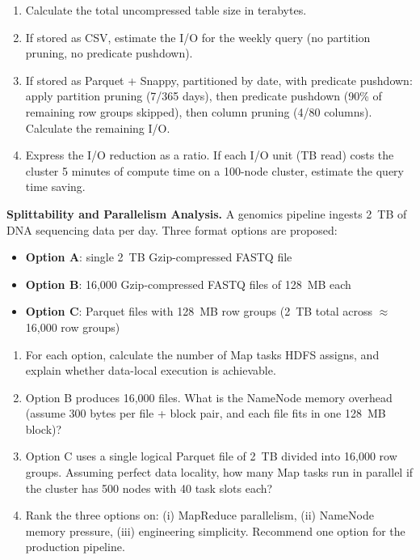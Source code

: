 \begin{enumerate}[label=(\alph*)]
  \item Calculate the total uncompressed table size in terabytes.
  \item If stored as CSV, estimate the I/O for the weekly query
        (no partition pruning, no predicate pushdown).
  \item If stored as Parquet + Snappy, partitioned by date, with
        predicate pushdown: apply partition pruning (7/365 days),
        then predicate pushdown (90\% of remaining row groups skipped),
        then column pruning (4/80 columns). Calculate the remaining I/O.
  \item Express the I/O reduction as a ratio. If each I/O unit
        (TB read) costs the cluster 5 minutes of compute time on
        a 100-node cluster, estimate the query time saving.
\end{enumerate}

\ap \textbf{Splittability and Parallelism Analysis.}
A genomics pipeline ingests 2~TB of DNA sequencing data per day.
Three format options are proposed:

\begin{itemize}
  \item \textbf{Option A}: single 2~TB Gzip-compressed FASTQ file
  \item \textbf{Option B}: 16{,}000 Gzip-compressed FASTQ files of
        128~MB each
  \item \textbf{Option C}: Parquet files with 128~MB row groups
        (2~TB total across $\approx$16{,}000 row groups)
\end{itemize}

\begin{enumerate}[label=(\alph*)]
  \item For each option, calculate the number of Map tasks HDFS assigns,
        and explain whether data-local execution is achievable.
  \item Option B produces 16{,}000 files. What is the NameNode memory
        overhead (assume 300 bytes per file + block pair, and each
        file fits in one 128~MB block)?
  \item Option C uses a single logical Parquet file of 2~TB divided
        into 16{,}000 row groups. Assuming perfect data locality, how many
        Map tasks run in parallel if the cluster has 500 nodes with
        40 task slots each?
  \item Rank the three options on: (i) MapReduce parallelism, (ii)
        NameNode memory pressure, (iii) engineering simplicity.
        Recommend one option for the production pipeline.
\end{enumerate}

